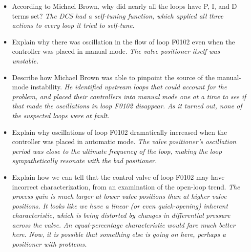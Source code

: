 \begin{itemize}
\item{} According to Michael Brown, why did nearly all the loops have P, I, and D terms set?  {\it The DCS had a self-tuning function, which applied all three actions to every loop it tried to self-tune.}
\item{} Explain why there was oscillation in the flow of loop F0102 even when the controller was placed in manual mode.  {\it The valve positioner itself was unstable.}
\item{} Describe how Michael Brown was able to pinpoint the source of the manual-mode instability.  {\it He identified upstream loops that could account for the problem, and placed their controllers into manual mode one at a time to see if that made the oscillations in loop F0102 disappear.  As it turned out, none of the suspected loops were at fault.}
\item{} Explain why oscillations of loop F0102 dramatically increased when the controller was placed in automatic mode.  {\it The valve positioner's oscillation period was close to the ultimate frequency of the loop, making the loop sympathetically resonate with the bad positioner.}
\item{} Explain how we can tell that the control valve of loop F0102 may have incorrect characterization, from an examination of the open-loop trend.  {\it The process gain is much larger at lower valve positions than at higher valve positions.  It looks like we have a linear (or even quick-opening) inherent characteristic, which is being distorted by changes in differential pressure across the valve.  An equal-percentage characteristic would fare much better here.  Now, it is possible that something else is going on here, perhaps a positioner with problems.}
\end{itemize}






